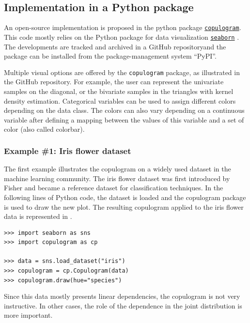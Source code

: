 \subsection{Implementation in a Python package}

An open-source implementation is proposed in the python package \href{https://github.com/efekhari27/copulogram}{\texttt{copulogram}}. 
This code mostly relies on the Python package for data visualization \href{https://seaborn.pydata.org/}{\texttt{seaborn}} \citep{waskom_2021_seaborn}. 
The developments are tracked and archived in a GitHub repository\footnotemark and the package can be installed from the package-management system ``PyPI''. 

Multiple visual options are offered by the \texttt{copulogram} package, as illustrated in the GitHub repository. 
For example, the user can represent the univariate samples on the diagonal, or the bivariate samples in the triangles with kernel density estimation.  
Categorical variables can be used to assign different colors depending on the data class. 
The colors can also vary depending on a continuous variable after defining a mapping between the values of this variable and a set of color (also called colorbar).






\subsubsection{Example \#1: Iris flower dataset}

The first example illustrates the copulogram on a widely used dataset in the machine learning community. 
The iris flower dataset was first introduced by Fisher and became a reference dataset for classification techniques. 
In the following lines of Python code, the dataset is loaded and the copulogram package is used to draw the new plot. 
The resulting copulogram applied to the iris flower data is represented in . 
\lstset{style=mystyle, language=python}
%
\begin{lstlisting}
>>> import seaborn as sns
>>> import copulogram as cp

>>> data = sns.load_dataset("iris")
>>> copulogram = cp.Copulogram(data)
>>> copulogram.draw(hue="species")
\end{lstlisting}
%
Since this data mostly presents linear dependencies, the copulogram is not very instructive. 
In other cases, the role of the dependence in the joint distribution is more important.



